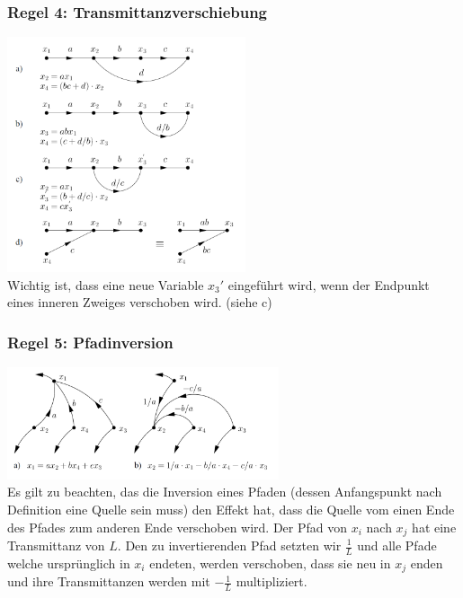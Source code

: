 \begin{multicols}{2}
	      \subsubsection{Regel 4: Transmittanzverschiebung }
	        \includegraphics[width=7cm]{./bilder/transmittanzverschiebung.png} \\
	        Wichtig ist, dass eine neue Variable $x_3'$ eingeführt wird, wenn der Endpunkt eines
	        inneren Zweiges verschoben wird. \newline (siehe c)    
	    
	      \subsubsection{Regel 5: Pfadinversion }
	        \includegraphics[width=8cm]{./bilder/pfadinversion.png} \\
	        Es gilt zu beachten, das die Inversion eines Pfaden (dessen Anfangspunkt nach Definition
	        eine Quelle sein muss) den Effekt hat, dass die Quelle vom einen Ende des Pfades zum anderen
	        Ende verschoben wird. Der Pfad von $x_i$ nach $x_j$ hat eine Transmittanz von $L$. 
	        Den zu invertierenden Pfad setzten wir $\frac{1}{L}$ und alle Pfade welche ursprünglich in
	        $x_i$ endeten, werden verschoben, dass sie neu in $x_j$ enden und ihre Transmittanzen werden
	        mit $-\frac{1}{L}$ multipliziert.
	        

\end{multicols}

